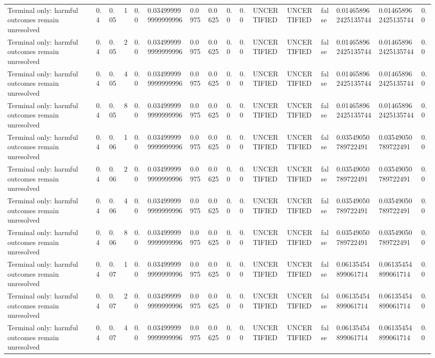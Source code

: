 \begin{tabular}{llllllllllllllll}
Terminal only: harmful outcomes remain unresolved & 0.4 & 0.05 & 1 & 0.0 & 0.034999999999999996 & 0.0975 & 0.0625 & 0.0 & 0.0 & UNCERTIFIED & UNCERTIFIED & false & 0.014658962425135744 & 0.014658962425135744 & 0.0 \\
Terminal only: harmful outcomes remain unresolved & 0.4 & 0.05 & 2 & 0.0 & 0.034999999999999996 & 0.0975 & 0.0625 & 0.0 & 0.0 & UNCERTIFIED & UNCERTIFIED & false & 0.014658962425135744 & 0.014658962425135744 & 0.0 \\
Terminal only: harmful outcomes remain unresolved & 0.4 & 0.05 & 4 & 0.0 & 0.034999999999999996 & 0.0975 & 0.0625 & 0.0 & 0.0 & UNCERTIFIED & UNCERTIFIED & false & 0.014658962425135744 & 0.014658962425135744 & 0.0 \\
Terminal only: harmful outcomes remain unresolved & 0.4 & 0.05 & 8 & 0.0 & 0.034999999999999996 & 0.0975 & 0.0625 & 0.0 & 0.0 & UNCERTIFIED & UNCERTIFIED & false & 0.014658962425135744 & 0.014658962425135744 & 0.0 \\
Terminal only: harmful outcomes remain unresolved & 0.4 & 0.06 & 1 & 0.0 & 0.034999999999999996 & 0.0975 & 0.0625 & 0.0 & 0.0 & UNCERTIFIED & UNCERTIFIED & false & 0.03549050789722491 & 0.03549050789722491 & 0.0 \\
Terminal only: harmful outcomes remain unresolved & 0.4 & 0.06 & 2 & 0.0 & 0.034999999999999996 & 0.0975 & 0.0625 & 0.0 & 0.0 & UNCERTIFIED & UNCERTIFIED & false & 0.03549050789722491 & 0.03549050789722491 & 0.0 \\
Terminal only: harmful outcomes remain unresolved & 0.4 & 0.06 & 4 & 0.0 & 0.034999999999999996 & 0.0975 & 0.0625 & 0.0 & 0.0 & UNCERTIFIED & UNCERTIFIED & false & 0.03549050789722491 & 0.03549050789722491 & 0.0 \\
Terminal only: harmful outcomes remain unresolved & 0.4 & 0.06 & 8 & 0.0 & 0.034999999999999996 & 0.0975 & 0.0625 & 0.0 & 0.0 & UNCERTIFIED & UNCERTIFIED & false & 0.03549050789722491 & 0.03549050789722491 & 0.0 \\
Terminal only: harmful outcomes remain unresolved & 0.4 & 0.07 & 1 & 0.0 & 0.034999999999999996 & 0.0975 & 0.0625 & 0.0 & 0.0 & UNCERTIFIED & UNCERTIFIED & false & 0.06135454899061714 & 0.06135454899061714 & 0.0 \\
Terminal only: harmful outcomes remain unresolved & 0.4 & 0.07 & 2 & 0.0 & 0.034999999999999996 & 0.0975 & 0.0625 & 0.0 & 0.0 & UNCERTIFIED & UNCERTIFIED & false & 0.06135454899061714 & 0.06135454899061714 & 0.0 \\
Terminal only: harmful outcomes remain unresolved & 0.4 & 0.07 & 4 & 0.0 & 0.034999999999999996 & 0.0975 & 0.0625 & 0.0 & 0.0 & UNCERTIFIED & UNCERTIFIED & false & 0.06135454899061714 & 0.06135454899061714 & 0.0 \\

\end{tabular}
